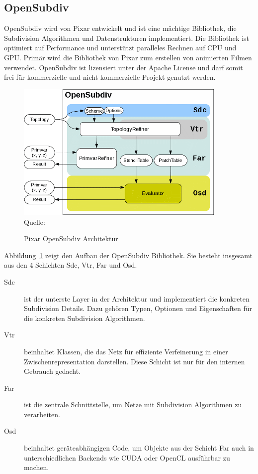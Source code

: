 \subsection{OpenSubdiv}

OpenSubdiv wird von Pixar entwickelt und ist eine mächtige Bibliothek, die Subdivision Algorithmen und Datenstrukturen implementiert.
Die Bibliothek ist optimiert auf Performance und unterstützt paralleles Rechnen auf CPU und GPU.
Primär wird die Bibliothek von Pixar zum erstellen von animierten Filmen verwendet.
OpenSubdiv ist lizensiert unter der Apache License und darf somit frei für kommerzielle und nicht kommerzielle Projekt genutzt werden.

\begin{figure}[h]
  \caption{Pixar OpenSubdiv Architektur}
  \centering
  \includegraphics[width=0.9\textwidth]{content/media/pixar_opensubdiv}
  \\Quelle: \cite{Pixar.27.07.2015}
  \label{fig:pixar_opensubdiv}
\end{figure}

Abbildung~\ref{fig:pixar_opensubdiv} zeigt den Aufbau der OpenSubdiv Bibliothek.
Sie besteht insgesamt aus den 4 Schichten \ac{Sdc}, \ac{Vtr}, \ac{Far} und \ac{Osd}.
\cite{Pixar.27.07.2015}

\begin{description}
 \item[\acs{Sdc}] ist der unterste Layer in der Architektur und implementiert die konkreten Subdivision Details.
 Dazu gehören Typen, Optionen und Eigenschaften für die konkreten Subdivision Algorithmen.
 \item[\acs{Vtr}] beinhaltet Klassen, die das Netz für effiziente Verfeinerung in einer Zwischenrepresentation darstellen.
 Diese Schicht ist nur für den internen Gebrauch gedacht.
 \item[\acs{Far}] ist die zentrale Schnittstelle, um Netze mit Subdivision Algorithmen zu verarbeiten.
 \item[\acs{Osd}] beinhaltet geräteabhängigen Code, um Objekte aus der Schicht \acs{Far} auch in unterschiedlichen Backends wie
 \acs{CUDA} oder OpenCL ausführbar zu machen.
\end{description}

